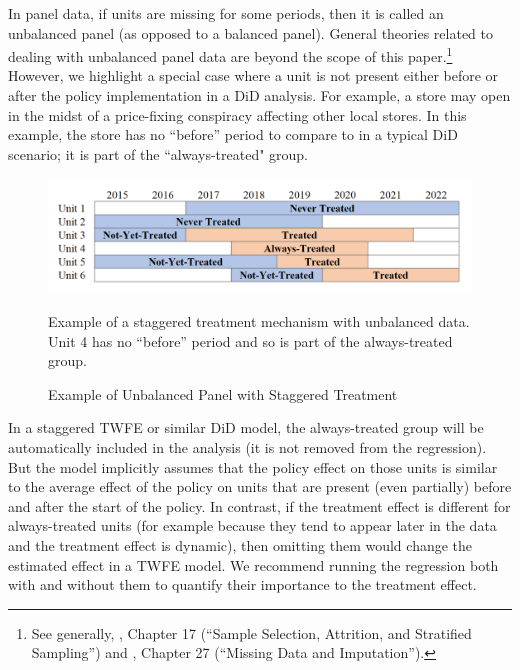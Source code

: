 \documentclass[12pt]{article}
\begin{document}
In panel data, if units are missing for some periods, then it is called an unbalanced panel (as opposed to a balanced panel). General theories related to dealing with unbalanced panel data are beyond the scope of this paper.\footnote{See generally, \citet{wooldridge2010a}, Chapter 17 (“Sample Selection, Attrition, and Stratified Sampling”) and \citet{cameron2020}, Chapter 27 (“Missing Data and Imputation”).}  However, we highlight a special case where a unit is not present either before or after the policy implementation in a DiD analysis. For example, a store may open in the midst of a price-fixing conspiracy affecting other local stores. In this example, the store has no “before” period to compare to in a typical DiD scenario; it is part of the ``always-treated" group.
\begin{figure}[H]
    \centering
    \caption{Example of Unbalanced Panel with Staggered Treatment}
    \includegraphics[width=5in]{Figures/Visual Staggered Unbalanced Treatment.PNG}
    \vspace{2mm}
    \footnotesize \begin{singlespace*}
        \parbox{5.5in}{Example of a staggered treatment mechanism with unbalanced data. Unit 4 has no “before” period and so is part of the always-treated group.}
    \end{singlespace*}
    \label{fig:visual-unbalanced}
\end{figure}
\noindent In a staggered TWFE or similar DiD model, the always-treated group will be automatically included in the analysis (it is not removed from the regression). But the model implicitly assumes that the policy effect on those units is similar to the average effect of the policy on units that are present (even partially) before and after the start of the policy. In contrast, if the treatment effect is different for always-treated units (for example because they tend to appear later in the data and the treatment effect is dynamic), then omitting them would change the estimated effect in a TWFE model. We recommend running the regression both with and without them to quantify their importance to the treatment effect.
\end{document}
